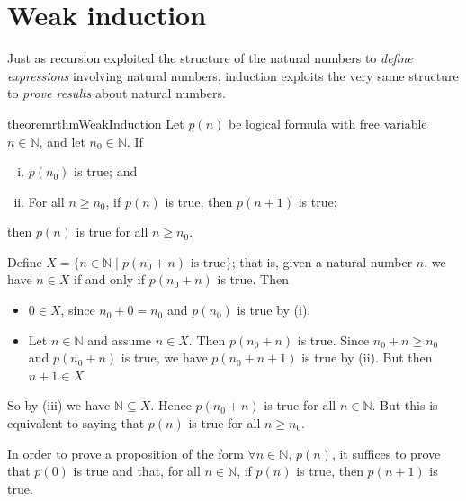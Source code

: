 \section{Weak induction}

Just as recursion exploited the structure of the natural numbers to \textit{define expressions} involving natural numbers, induction exploits the very same structure to \textit{prove results} about natural numbers.

\begin{restatable}{theorem}{rthmWeakInduction}
\label{thmWeakInduction}
Let $p(n)$ be logical formula with free variable $n \in \mathbb{N}$, and let $n_0 \in \mathbb{N}$. If
\begin{enumerate}[(i)] 
\item $p(n_0)$ is true; and
\item For all $n \ge n_0$, if $p(n)$ is true, then $p(n+1)$ is true;
\end{enumerate}
then $p(n)$ is true for all $n \ge n_0$.
\end{restatable}

\begin{cproof}
Define $X = \{ n \in \mathbb{N} \mid p(n_0 + n) \text{ is true} \}$; that is, given a natural number $n$, we have $n \in X$ if and only if $p(n_0 + n)$ is true. Then
\begin{itemize}
\item $0 \in X$, since $n_0 + 0 = n_0$ and $p(n_0)$ is true by (i).
\item Let $n \in \mathbb{N}$ and assume $n \in X$. Then $p(n_0+n)$ is true. Since $n_0 + n \ge n_0$ and $p(n_0+n)$ is true, we have $p(n_0+n+1)$ is true by (ii). But then $n+1 \in X$.
\end{itemize}

So by (iii) we have $\mathbb{N} \subseteq X$. Hence $p(n_0 + n)$ is true for all $n \in \mathbb{N}$. But this is equivalent to saying that $p(n)$ is true for all $n \ge n_0$.
\end{cproof}

\begin{strategy}
In order to prove a proposition of the form $\forall n \in \mathbb{N},\, p(n)$, it suffices to prove that $p(0)$ is true and that, for all $n \in \mathbb{N}$, if $p(n)$ is true, then $p(n+1)$ is true.
\end{strategy}

